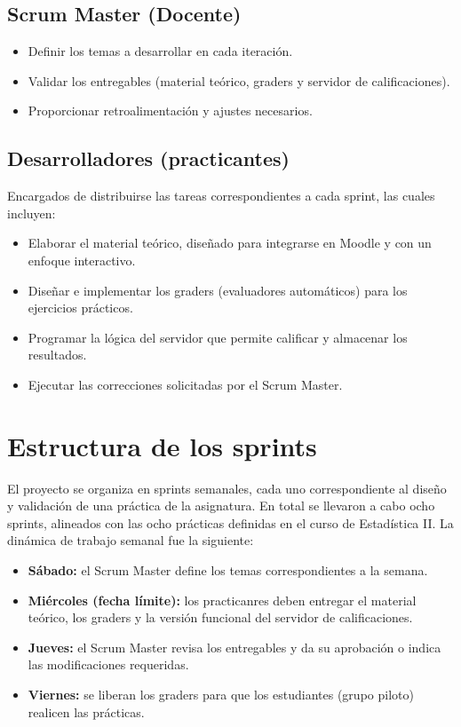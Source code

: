 \documentclass[letter,oneside,12pt,spanish]{report}
\begin{document}
\subsection*{Scrum Master (Docente)}
\begin{itemize}[leftmargin=*]
	\item Definir los temas a desarrollar en cada iteración.
	\item Validar los entregables (material teórico, graders y servidor de calificaciones).
	\item Proporcionar retroalimentación y ajustes necesarios.
\end{itemize}

\subsection*{Desarrolladores (practicantes)}
Encargados de distribuirse las tareas correspondientes a cada sprint, las cuales incluyen:
\begin{itemize}[leftmargin=*]
	\item Elaborar el material teórico, diseñado para integrarse en Moodle y con un enfoque interactivo.
	\item Diseñar e implementar los graders (evaluadores automáticos) para los ejercicios prácticos.
	\item Programar la lógica del servidor que permite calificar y almacenar los resultados.
	\item Ejecutar las correcciones solicitadas por el Scrum Master.
\end{itemize}

\section{Estructura de los sprints}

El proyecto se organiza en sprints semanales, cada uno correspondiente al diseño y validación de una práctica de la asignatura. En total se llevaron a cabo ocho sprints, alineados con las ocho prácticas definidas en el curso de Estadística II. La dinámica de trabajo semanal fue la siguiente:

\begin{itemize}
	\item \textbf{Sábado:} el Scrum Master define los temas correspondientes a la semana.  
	\item \textbf{Miércoles (fecha límite):} los practicanres deben entregar el material teórico, los graders y la versión funcional del servidor de calificaciones.  
	\item \textbf{Jueves:} el Scrum Master revisa los entregables y da su aprobación o indica las modificaciones requeridas.  
	\item \textbf{Viernes:} se liberan los graders para que los estudiantes (grupo piloto) realicen las prácticas.  
\end{itemize}
\end{document}
